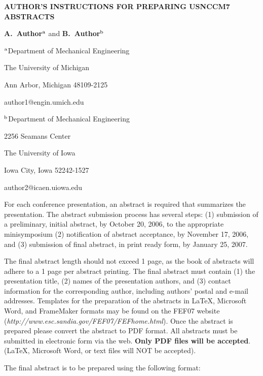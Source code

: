\documentclass[12pt]{article}
\begin{document}
\centerline{\bf AUTHOR'S INSTRUCTIONS FOR PREPARING USNCCM7 ABSTRACTS}

\vspace{12pt}

\centerline{ {\bf A.~Author}$^{\rm a}$ and {\bf B.~Author}$^{\rm b}$}

\vspace{12pt}

\centerline{$^{\rm a}$Department of Mechanical Engineering}
\centerline{The University of Michigan}
\centerline{Ann Arbor, Michigan 48109-2125}
\centerline{author1@engin.umich.edu}

\vspace{12pt}

\centerline{$^{\rm b}$Department of Mechanical Engineering}
\centerline{2256 Seamans Center}
\centerline{The University of Iowa}
\centerline{Iowa City, Iowa 52242-1527}
\centerline{author2@icaen.uiowa.edu}

\vspace{12pt}
\vspace{12pt}

For each conference presentation, an abstract is required that
summarizes the presentation. The abstract submission process has
several steps: (1) submission of a preliminary, initial abstract, by
October 20, 2006, to the appropriate minisymposium (2) notification 
of abstract acceptance, by November 17, 2006, and (3) submission of final 
abstract, in print ready form, by January 25, 2007.

\vspace{12pt}

The final abstract length should not exceed 1 page, as the book of
abstracts will adhere to a 1 page per abstract printing. The final
abstract must contain (1) the presentation title, (2) names of the
presentation authors, and (3) contact information for the
corresponding author, including authors' postal and e-mail
addresses. Templates for the preparation of the abstracts in LaTeX,
Microsoft Word, and FrameMaker formats may be found on the FEF07
website ({\em http://www.esc.sandia.gov/FEF07/FEFhome.html}). Once the abstract is
prepared please convert the abstract to PDF format. All abstracts must
be submitted in electronic form via the web. {\bf Only PDF files will be
accepted}. (LaTeX, Microsoft Word, or text files will NOT be accepted). 

\vspace{12pt}

The final abstract is to be prepared using the following format:
\end{document}
